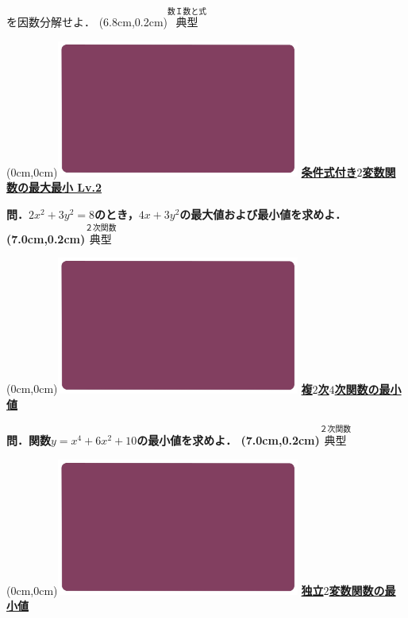 \documentclass[10pt,
fleqn,
dvipdfmx,
uplatex
]{jsarticle}
\begin{document}
を因数分解せよ．
\at(6.8cm,0.2cm){\small\color{bradorange}$\overset{\text{数Ｉ数と式}}{\text{典型}}$}


\newpage



\at(0cm,0cm){\includegraphics[width=8cm,bb=0 0 1920 1080]{./youtube/thumbnails/templates/smart_background/２次関数.jpeg}}
{\color{orange}\bf\boldmath\normalsize\underline{条件式付き$2$変数関数の最大最小 Lv.2 }}\vspace{0.3zw}

\LARGE 
\bf\boldmath 問．$2x^2+3y^2=8$のとき，$4x+3y^2$の最大値および最小値を求めよ．
\at(7.0cm,0.2cm){\small\color{bradorange}$\overset{\text{２次関数}}{\text{典型}}$}


\newpage



\at(0cm,0cm){\includegraphics[width=8cm,bb=0 0 1920 1080]{./youtube/thumbnails/templates/smart_background/２次関数.jpeg}}
{\color{orange}\bf\boldmath\LARGE\underline{複$2$次$4$次関数の最小値}}\vspace{0.3zw}

\huge 
\bf\boldmath 問．関数$y=x^4+6x^2+{10}$の最小値を求めよ．
\at(7.0cm,0.2cm){\small\color{bradorange}$\overset{\text{２次関数}}{\text{典型}}$}


\newpage



\at(0cm,0cm){\includegraphics[width=8cm,bb=0 0 1920 1080]{./youtube/thumbnails/templates/smart_background/２次関数.jpeg}}
{\color{orange}\bf\boldmath\LARGE\underline{独立$2$変数関数の最小値}}\vspace{0.3zw}
\end{document}
